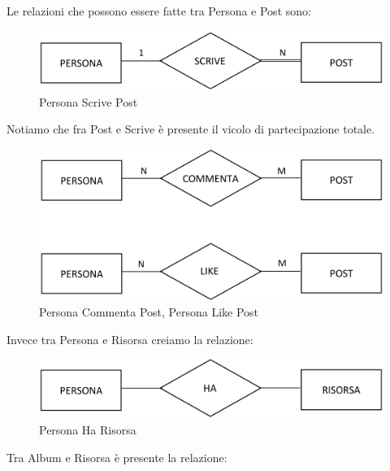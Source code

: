 Le relazioni che possono essere fatte tra Persona e Post sono:

\begin{center}
\begin{figure}[H]
\centering
\includegraphics[scale=1]{figures/persona_scrive_post.png}
\caption{Persona Scrive Post}
\end{figure}
\end{center}

Notiamo che fra Post e Scrive è presente il vicolo di partecipazione totale.

\begin{center}
\begin{figure}[H]
\centering
\includegraphics[scale=1]{figures/pcp_plp.png}
\caption{Persona Commenta Post, Persona Like Post}
\end{figure}
\end{center}

Invece tra Persona e Risorsa creiamo la relazione: 

\begin{center}
\begin{figure}[H]
\centering
\includegraphics[scale=1]{figures/persona_ha_risorsa.png}
\caption{Persona Ha Risorsa}
\end{figure}
\end{center}

Tra Album e Risorsa è presente la relazione: 

